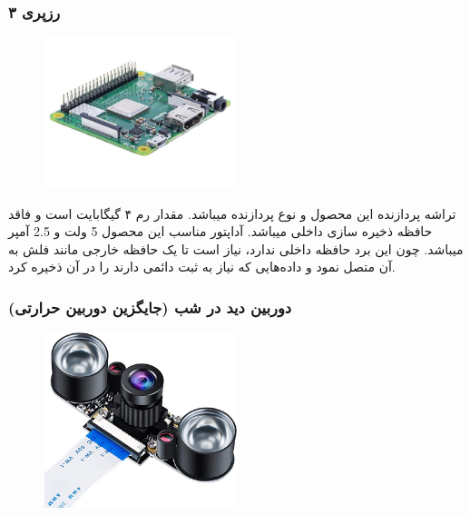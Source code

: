 \documentclass[12pt]{article}
\begin{document}
\subsubsection{رزپری ۳}

\begin{figure}[h]
	\begin{center}
		\includegraphics[width=0.5\textwidth]{raspberry.png}
	\end{center}
	\caption{}
\end{figure}

تراشه پردازنده این محصول  و نوع پردازنده  میباشد. مقدار رم ۴ گیگابایت است و فاقد حافظه ذخیره سازی داخلی میباشد. آداپتور مناسب این محصول 5 ولت و 2.5 آمپر میباشد. چون این برد حافظه داخلی ندارد، نیاز است تا یک حافظه خارجی مانند فلش به آن متصل نمود و داده‌هایی که نیاز به ثبت دائمی دارند را در آن ذخیره کرد.



\subsubsection{دوربین دید در شب (جایگزین دوربین حرارتی)}

\begin{figure}[h]
	\begin{center}
		\includegraphics[width=0.5\textwidth]{camera.jpg}
	\end{center}
	\caption{}
\end{figure}
\end{document}
